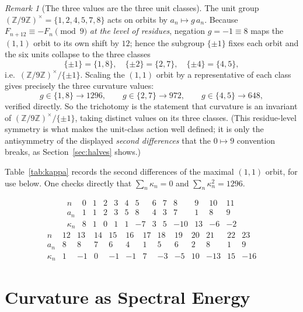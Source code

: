 \documentclass[12pt]{article}
\theoremstyle{remark}
\newtheorem{rem}{Remark}
\begin{document}
\begin{rem}[The three values are the three unit classes]\label{rem:units}
The unit group $(\mathbb Z/9\mathbb Z)^\times=\{1,2,4,5,7,8\}$ acts on orbits by
$a_n\mapsto g\,a_n$. Because $F_{n+12}\equiv -F_n\pmod 9$ \emph{at the level of residues},
negation $g=-1\equiv 8$ maps the $(1,1)$ orbit to its own shift by $12$; hence the subgroup
$\{\pm1\}$ fixes each orbit and the six units collapse to the three classes
\[
\{\pm1\}=\{1,8\},\quad \{\pm2\}=\{2,7\},\quad \{\pm4\}=\{4,5\},
\]
i.e.\ $(\mathbb Z/9\mathbb Z)^\times/\{\pm1\}$. Scaling the $(1,1)$ orbit by a
representative of each class gives precisely the three curvature values:
\[
g\in\{1,8\}\!\to\!1296,\qquad g\in\{2,7\}\!\to\!972,\qquad g\in\{4,5\}\!\to\!648,
\]
verified directly. So the trichotomy is the statement that curvature is an invariant of
$(\mathbb Z/9\mathbb Z)^\times/\{\pm1\}$, taking distinct values on its three classes.
(This residue-level symmetry is what makes the unit-class action well defined; it is only
the antisymmetry of the displayed \emph{second differences} that the $0\mapsto 9$
convention breaks, as Section~\ref{sec:halves} shows.)
\end{rem}

Table~\ref{tab:kappa} records the second differences of the maximal $(1,1)$ orbit, for use
below. One checks directly that $\sum_n\kappa_n=0$ and $\sum_n\kappa_n^2=1296$.

\begin{table}[h!]
\centering
\[
\begin{array}{c|cccccccccccc}
n & 0 & 1 & 2 & 3 & 4 & 5 & 6 & 7 & 8 & 9 & 10 & 11\\\hline
a_n & 1 & 1 & 2 & 3 & 5 & 8 & 4 & 3 & 7 & 1 & 8 & 9\\
\kappa_n & 8 & 1 & 0 & 1 & 1 & -7 & 3 & 5 & -10 & 13 & -6 & -2
\end{array}
\]
\[
\begin{array}{c|cccccccccccc}
n & 12 & 13 & 14 & 15 & 16 & 17 & 18 & 19 & 20 & 21 & 22 & 23\\\hline
a_n & 8 & 8 & 7 & 6 & 4 & 1 & 5 & 6 & 2 & 8 & 1 & 9\\
\kappa_n & 1 & -1 & 0 & -1 & -1 & 7 & -3 & -5 & 10 & -13 & 15 & -16
\end{array}
\]
\caption{Second differences for the $(1,1)$ orbit. $\sum\kappa_n=0$, $\sum\kappa_n^2=1296$.}
\label{tab:kappa}
\end{table}

\section{Curvature as Spectral Energy}\label{sec:spectral}
\end{document}
